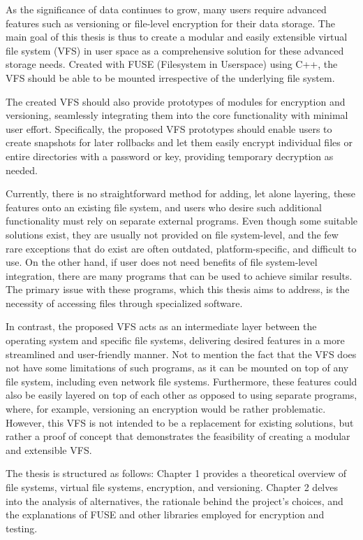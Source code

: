 
As the significance of data continues to grow, many users require advanced features such as versioning or file-level encryption for their data storage.
The main goal of this thesis is thus to create a modular and easily extensible virtual file system (VFS) in user space as a comprehensive solution for these advanced storage needs.
Created with FUSE (Filesystem in Userspace) using C++, the VFS should be able to be mounted irrespective of the underlying file system.

The created VFS should also provide prototypes of modules for encryption and versioning, seamlessly integrating them into the core functionality with minimal user effort.
Specifically, the proposed VFS prototypes should enable users to create snapshots for later rollbacks and let them easily encrypt individual files or entire directories with a password or key, providing temporary decryption as needed.

Currently, there is no straightforward method for adding, let alone layering, these features onto an existing file system, and users who desire such additional functionality must rely on separate external programs.
Even though some suitable solutions exist, they are usually not provided on file system-level, and the few rare exceptions that do exist are often outdated, platform-specific, and difficult to use.
On the other hand, if user does not need benefits of file system-level integration, there are many programs that can be used to achieve similar results.
The primary issue with these programs, which this thesis aims to address, is the necessity of accessing files through specialized software.

In contrast, the proposed VFS acts as an intermediate layer between the operating system and specific file systems, delivering desired features in a more streamlined and user-friendly manner.
Not to mention the fact that the VFS does not have some limitations of such programs, as it can be mounted on top of any file system, including even network file systems.
Furthermore, these features could also be easily layered on top of each other as opposed to using separate programs, where, for example, versioning an encryption would be rather problematic.
However, this VFS is not intended to be a replacement for existing solutions, but rather a proof of concept that demonstrates the feasibility of creating a modular and extensible VFS\@.

The thesis is structured as follows: Chapter 1 provides a theoretical overview of file systems, virtual file systems, encryption, and versioning.
Chapter 2 delves into the analysis of alternatives, the rationale behind the project's choices, and the explanations of FUSE and other libraries employed for encryption and testing.

